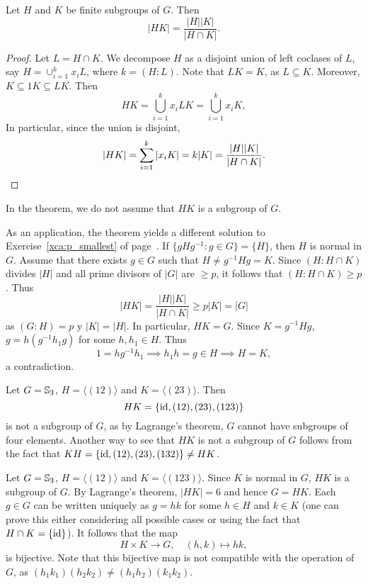 \begin{theorem}
\label{thm:|HK|}
    Let $H$ and $K$ be finite subgroups of $G$. 
    Then 
    \[
        |HK|=\frac{|H||K|}{|H\cap K|}.
    \]
\end{theorem}

\begin{proof}
Let $L=H\cap K$.
We decompose $H$ as a disjoint union of left coclases of $L$, say 
$H=\cup_{i=1}^k x_iL$, where $k=(H:L)$. Note that $LK=K$, as $L\subseteq K$. Moreover, $K\subseteq 1K\subseteq LK$.
Then
\[
HK=\bigcup_{i=1}^k x_iLK=\bigcup_{i=1}^k x_iK,
\]
In particular, since the union is disjoint, 
\[
|HK|=\sum_{i=1}^k |x_iK|=k|K|=\frac{|H||K|}{|H\cap K|}.\qedhere
\]
\end{proof}

In the theorem, we do not assume that $HK$ is a subgroup of $G$. 

As an application, the theorem yields a different solution to Exercise~\ref{xca:p_smallest} of page~\pageref{xca:p_smallest}. 
If $\{gHg^{-1}:g\in G\}=\{H\}$, then $H$ is normal in $G$. Assume that
there exists $g\in G$ such that
$H\ne g^{-1}Hg=K$. Since $(H:H\cap K)$ divides $|H|$ 
and all prime divisors of $|G|$ 
are $\geq p$, it follows that $(H:H\cap K)\geq p$. Thus 
\[
|HK|=\frac{|H||K|}{|H\cap K|}\geq p|K|=|G|
\]
as $(G:H)=p$ y $|K|=|H|$. In particular, $HK=G$. Since $K=g^{-1}Hg$, 
$g=h(g^{-1}h_1g)$ for some $h,h_1\in H$. Thus 
\[
1=hg^{-1}h_1\implies h_1h=g\in H\implies H=K,
\]
a contradiction.

\begin{example}
Let $G=\mathbb{S}_3$, $H=\langle (12)\rangle$ and $K=\langle (23)\rangle$. Then 
\[
HK=\{\operatorname{id},(12),(23),(123)\}
\]
is not a subgroup of $G$, as by Lagrange's theorem, 
$G$ cannot have subgroups of four elements. Another way 
to see that $HK$ is not a subgroup of $G$ follows from 
the fact that 
$KH=\{\operatorname{id},(12),(23),(132)\}\ne HK$.
\end{example}

\begin{example}
Let $G=\mathbb{S}_3$, $H=\langle (12)\rangle$ and $K=\langle (123)\rangle$.
Since $K$ is normal in $G$, $HK$ is a subgroup of $G$. By Lagrange's theorem, $|HK|=6$ and hence $G=HK$.
Each $g\in G$ can be written uniquely as $g=hk$ for some $h\in H$ and $k\in K$ (one can prove this either considering all possible cases or 
using the fact that $H\cap K=\{\operatorname{id}\}$). It follows that the map 
\[
H\times K\to G,\quad
(h,k)\mapsto hk,
\]
is bijective. Note that this bijective map is not compatible 
with the operation of $G$, as 
$(h_1k_1)(h_2k_2)\ne (h_1h_2)(k_1k_2)$. 
\end{example}

